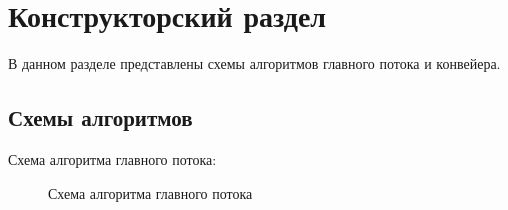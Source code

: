 \chapter{Конструкторский раздел}
В данном разделе представлены схемы алгоритмов главного потока и конвейера.


\section{Схемы алгоритмов}
Схема алгоритма главного потока:

\begin{figure}
	\caption{Схема алгоритма главного потока}
	\label{ZBufferAlg}
\end{figure}

